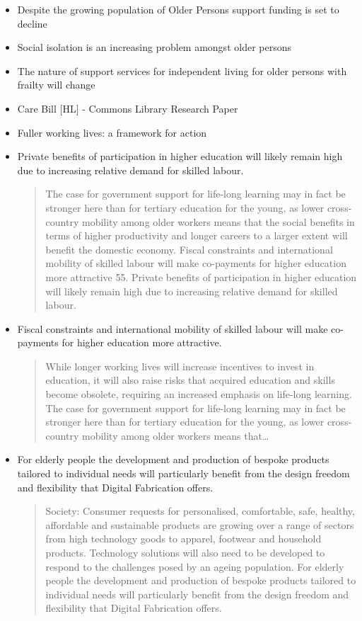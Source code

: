 \begin{itemize}
\item Despite the growing population of Older Persons support funding is set to decline
\item Social isolation is an increasing problem amongst older persons
\item The nature of support services for independent living for older persons with frailty will change
\item Care Bill [HL] - Commons Library Research Paper
\item Fuller working lives: a framework for action
\item Private benefits of participation in higher education will likely remain high due to increasing relative demand for skilled labour.
\begin{quotation}
The case for government support for life-long learning may in fact be stronger here than for tertiary education for the young, as lower cross-country mobility among older workers means that the social benefits in terms of higher productivity and longer careers to a larger extent will benefit the domestic economy. Fiscal constraints and international mobility of skilled labour will make co-payments for higher education more attractive 55. Private benefits of participation in higher education will likely remain high due to increasing relative demand for skilled labour.\end{quotation}
\item Fiscal constraints and international mobility of skilled labour will make co-payments for higher education more attractive.
\begin{quotation}
While longer working lives will increase incentives to invest in education, it will also raise risks that acquired education and skills become obsolete, requiring an increased emphasis on life-long learning. The case for government support for life-long learning may in fact be stronger here than for tertiary education for the young, as lower cross-country mobility among older workers means that\dots\end{quotation}
\item For elderly people the development and production of bespoke products tailored to individual needs will particularly benefit from the design freedom and flexibility that Digital Fabrication offers.
\begin{quotation}
Society: Consumer requests for personalised, comfortable, safe, healthy, affordable and sustainable products are growing over a range of sectors from high technology goods to apparel, footwear and household products. Technology solutions will also need to be developed to respond to the challenges posed by an ageing population. For elderly people the development and production of bespoke products tailored to individual needs will particularly benefit from the design freedom and flexibility that Digital Fabrication offers.\end{quotation}

\end{itemize}
